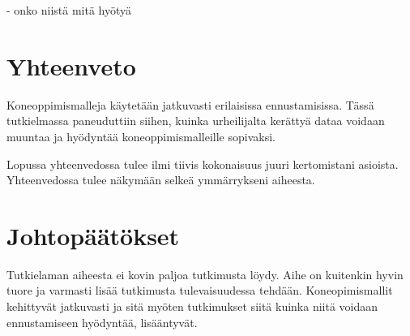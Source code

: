 \documentclass[utf8, bachelor]{gradu3}
\begin{document}
- onko niistä mitä hyötyä

\chapter{Yhteenveto}

Koneoppimismalleja käytetään jatkuvasti erilaisissa ennustamisissa. Tässä tutkielmassa paneuduttiin siihen, kuinka urheilijalta kerättyä 
dataa voidaan muuntaa ja hyödyntää koneoppimismalleille sopivaksi.

Lopussa yhteenvedossa tulee ilmi tiivis kokonaisuus juuri kertomistani asioista. Yhteenvedossa tulee näkymään selkeä ymmärrykseni aiheesta.

\chapter{Johtopäätökset}

Tutkielaman aiheesta ei kovin paljoa tutkimusta löydy. Aihe on kuitenkin hyvin tuore ja varmasti lisää tutkimusta tulevaisuudessa tehdään. 
Koneopimismallit kehittyvät jatkuvasti ja sitä myöten tutkimukset siitä kuinka niitä voidaan ennustamiseen hyödyntää, lisääntyvät.

\printbibliography
\end{document}

